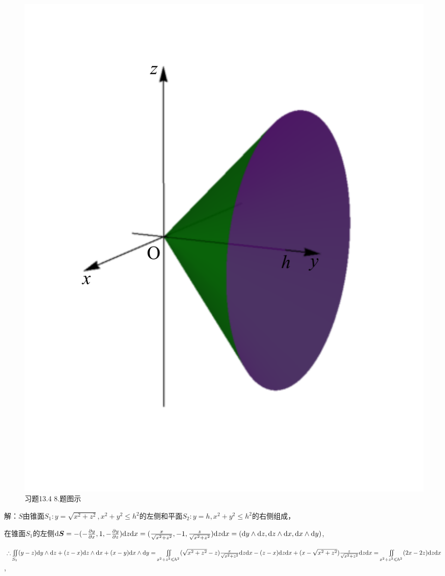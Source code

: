\documentclass[12pt,UTF8,fleqn]{ctexart}
\newcommand{\varIInt}[4]{\iint\limits_{#1}#2\mathrm d#3\mathrm d#4}
\newcommand{\md}[1]{\mathrm d#1}
\newcommand{\BSIInt}[2]{\iint\limits_{#1}#2}
\newcommand{\pp}[2]{\frac{\partial #1}{\partial #2}}
\begin{document}
\begin{enumerate}
\begin{figure}[H]
\begin{center}
\includegraphics[height=0.5\textheight]{Figures23/Fig13-4-8.pdf}
\end{center}
\caption{习题13.4 8.题图示}
\label{13-4-8}
\end{figure}

解：$S$由锥面$S_1:y=\sqrt{x^2+z^2},x^2+y^2\leqslant h^2$的左侧和平面$S_2:y=h,x^2+y^2\leqslant h^2$的右侧组成，

在锥面$S_1$的左侧$\md\bm S=-(-\pp yx,1,-\pp yz)\md z\md x=(\frac x{\sqrt{x^2+z^2}},-1,\frac z{\sqrt{x^2+z^2}})\md z\md x\\
=(\md y\wedge\md z,\md z\wedge\md x,\md x\wedge\md y)$,

$\therefore\BSIInt{S_1}{(y-z)\md y\wedge\md z+(z-x)\md z\wedge\md x+(x-y)\md x\wedge\md y}\\
=\BSIInt{x^2+z^2\leqslant h^2}{(\sqrt{x^2+z^2}-z)\frac x{\sqrt{x^2+z^2}}\md z\md x-(z-x)\md z\md x+(x-\sqrt{x^2+z^2})\frac z{\sqrt{x^2+z^2}}\md z\md x}\\
=\varIInt{x^2+z^2\leqslant h^2}{(2x-2z)}zx$,


\end{enumerate}
\end{document}
